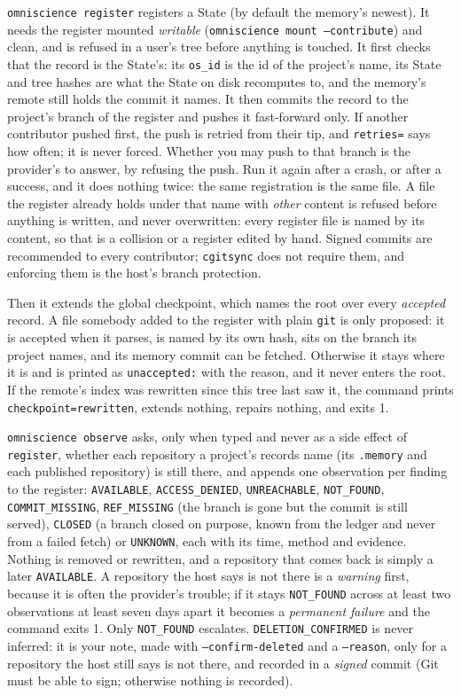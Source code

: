 \texttt{omniscience register} registers a State (by default the memory's newest).
It needs the register mounted \emph{writable} (\texttt{omniscience mount
--contribute}) and clean, and is refused in a user's tree before anything is
touched. It first checks that the record is the State's: its \texttt{os\_id} is the
id of the project's name, its State and tree hashes are what the State on disk
recomputes to, and the memory's remote still holds the commit it names. It then
commits the record to the project's branch of the register and pushes it
fast-forward only. If another contributor pushed first, the push is retried from
their tip, and \texttt{retries=} says how often; it is never forced. Whether you
may push to that branch is the provider's to answer, by refusing the push. Run it
again after a crash, or after a success, and it does nothing twice: the same
registration is the same file. A file the register already holds under that
name with \emph{other} content is refused before anything is written, and never
overwritten: every register file is named by its content, so that is a
collision or a register edited by hand. Signed commits are recommended to every
contributor; \texttt{cgitsync} does not require them, and enforcing them is the
host's branch protection.

Then it extends the global checkpoint, which names the root over every
\emph{accepted} record. A file somebody added to the register with plain
\texttt{git} is only proposed: it is accepted when it parses, is named by its own
hash, sits on the branch its project names, and its memory commit can be
fetched. Otherwise it stays where it is and is printed as
\texttt{unaccepted:} with the reason, and it never enters the root. If the
remote's index was rewritten since this tree last saw it, the command prints
\texttt{checkpoint=rewritten}, extends nothing, repairs nothing, and exits 1.

\texttt{omniscience observe} asks, only when typed and never as a side effect
of \texttt{register}, whether each repository a project's records name (its
\texttt{.memory} and each published repository) is still there, and appends one
observation per finding to the register: \texttt{AVAILABLE},
\texttt{ACCESS\_DENIED}, \texttt{UNREACHABLE}, \texttt{NOT\_FOUND},
\texttt{COMMIT\_MISSING}, \texttt{REF\_MISSING} (the branch is gone but the
commit is still served), \texttt{CLOSED} (a branch closed on purpose, known from
the ledger and never from a failed fetch) or \texttt{UNKNOWN}, each with its
time, method and evidence. Nothing is removed or rewritten, and a repository that
comes back is simply a later \texttt{AVAILABLE}. A repository the host says is not
there is a \emph{warning} first, because it is often the provider's trouble; if
it stays \texttt{NOT\_FOUND} across at least two observations at least seven days
apart it becomes a \emph{permanent failure} and the command exits 1. Only
\texttt{NOT\_FOUND} escalates. \texttt{DELETION\_CONFIRMED} is never inferred: it is
your note, made with \texttt{--confirm-deleted} and a \texttt{--reason}, only for
a repository the host still says is not there, and recorded in a \emph{signed}
commit (Git must be able to sign; otherwise nothing is recorded).

